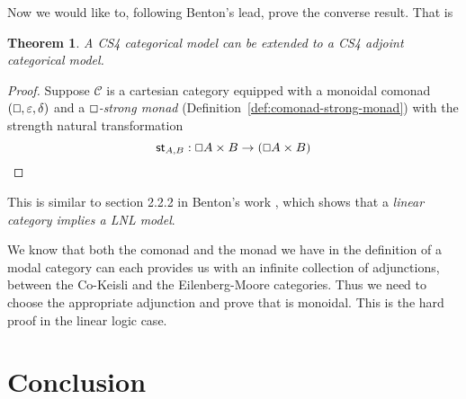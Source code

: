 \documentclass{article}
\let\Diamond\relax
\let\mto\to
\let\to\relax
\newcommand{\to}{\rightarrow}
\renewcommand{\Box}{\oblong}
\newcommand{\cat}[1]{\mathcal{#1}}
\newcommand{\pd}[0]{\times}
\newcommand{\st}[2]{\mathsf{st}_{#1,#2}}
\newtheorem{theorem}{Theorem}
\begin{document}
Now we would like to, following Benton's lead, 
prove the converse result. That is
\begin{theorem}
  A CS4 categorical model can be extended to a CS4 adjoint categorical model.
\end{theorem}
\begin{proof}
  Suppose $\cat{C}$ is a cartesian category equipped with a monoidal
  comonad $(\Box, \varepsilon, \delta)$ and a \emph{$\Box$-strong
    monad} (Definition~\ref{def:comonad-strong-monad}) with the
  strength natural transformation
  \[
  \st{A}{B} : \Box A \pd \Diamond B \mto \Diamond(\Box A \pd B)
  \]
  
\end{proof}
This is similar to section 2.2.2 in Benton's work \cite{benton1995},
which shows that a \textit{linear category implies a LNL model}.

We know that both the comonad and the monad we have in the definition of a modal category can each provides us with an infinite collection of adjunctions, between the Co-Keisli and the Eilenberg-Moore categories. Thus we need to choose the appropriate adjunction and prove that is monoidal. This is the hard proof in the linear logic case.


\section{Conclusion}




\appendix


\end{document}
